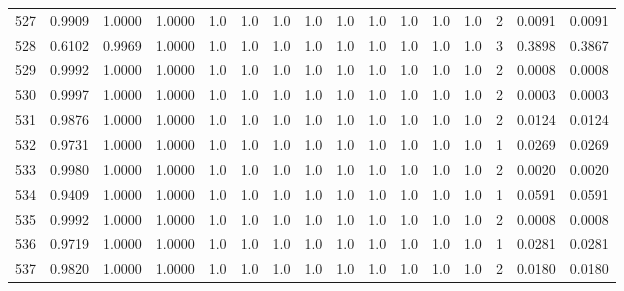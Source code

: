 \begin{tabular}{lrrrrrrrrrrrrrrr}
527 &      0.9909 &  1.0000 &  1.0000 &     1.0 &     1.0 &     1.0 &     1.0 &     1.0 &     1.0 &     1.0 &      1.0 &        1.0 &      2 &                    0.0091 &                     0.0091 \\
528 &      0.6102 &  0.9969 &  1.0000 &     1.0 &     1.0 &     1.0 &     1.0 &     1.0 &     1.0 &     1.0 &      1.0 &        1.0 &      3 &                    0.3898 &                     0.3867 \\
529 &      0.9992 &  1.0000 &  1.0000 &     1.0 &     1.0 &     1.0 &     1.0 &     1.0 &     1.0 &     1.0 &      1.0 &        1.0 &      2 &                    0.0008 &                     0.0008 \\
530 &      0.9997 &  1.0000 &  1.0000 &     1.0 &     1.0 &     1.0 &     1.0 &     1.0 &     1.0 &     1.0 &      1.0 &        1.0 &      2 &                    0.0003 &                     0.0003 \\
531 &      0.9876 &  1.0000 &  1.0000 &     1.0 &     1.0 &     1.0 &     1.0 &     1.0 &     1.0 &     1.0 &      1.0 &        1.0 &      2 &                    0.0124 &                     0.0124 \\
532 &      0.9731 &  1.0000 &  1.0000 &     1.0 &     1.0 &     1.0 &     1.0 &     1.0 &     1.0 &     1.0 &      1.0 &        1.0 &      1 &                    0.0269 &                     0.0269 \\
533 &      0.9980 &  1.0000 &  1.0000 &     1.0 &     1.0 &     1.0 &     1.0 &     1.0 &     1.0 &     1.0 &      1.0 &        1.0 &      2 &                    0.0020 &                     0.0020 \\
534 &      0.9409 &  1.0000 &  1.0000 &     1.0 &     1.0 &     1.0 &     1.0 &     1.0 &     1.0 &     1.0 &      1.0 &        1.0 &      1 &                    0.0591 &                     0.0591 \\
535 &      0.9992 &  1.0000 &  1.0000 &     1.0 &     1.0 &     1.0 &     1.0 &     1.0 &     1.0 &     1.0 &      1.0 &        1.0 &      2 &                    0.0008 &                     0.0008 \\
536 &      0.9719 &  1.0000 &  1.0000 &     1.0 &     1.0 &     1.0 &     1.0 &     1.0 &     1.0 &     1.0 &      1.0 &        1.0 &      1 &                    0.0281 &                     0.0281 \\
537 &      0.9820 &  1.0000 &  1.0000 &     1.0 &     1.0 &     1.0 &     1.0 &     1.0 &     1.0 &     1.0 &      1.0 &        1.0 &      2 &                    0.0180 &                     0.0180 \\

\end{tabular}
